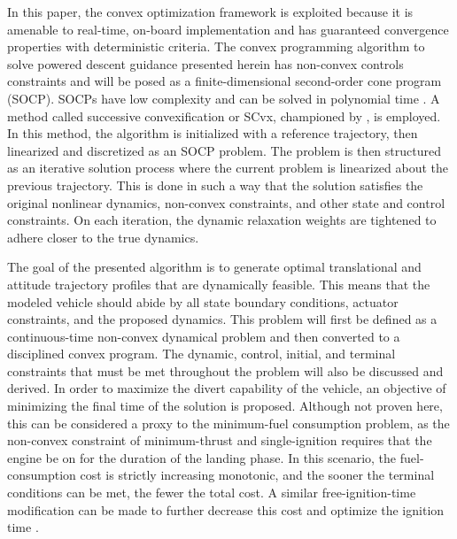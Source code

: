 \documentclass[conf]{new-aiaa}
\begin{document}
In this paper, the convex optimization framework is exploited because it is amenable to real-time, on-board implementation and has guaranteed convergence properties with deterministic criteria. The convex programming algorithm to solve powered descent guidance presented herein has non-convex controls constraints and will be posed as a finite-dimensional second-order cone program (SOCP). SOCPs have low complexity and can be solved in polynomial time \cite{nesterov1994interior} \cite{boyd2004convex}.
A method called successive convexification or SCvx, championed by \cite{mao2016successive}, is employed. In this method, the algorithm is initialized with a reference trajectory, then linearized and discretized as an SOCP problem. The problem is then structured as an iterative solution process where the current problem is linearized about the previous trajectory. This is done in such a way that the solution satisfies the original nonlinear dynamics, non-convex constraints, and other state and control constraints. On each iteration, the dynamic relaxation weights are tightened to adhere closer to the true dynamics.

The goal of the presented algorithm is to generate optimal translational and attitude trajectory profiles that are dynamically feasible. This means that the modeled vehicle should abide by all state boundary conditions, actuator constraints, and the proposed dynamics. This problem will first be defined as a continuous-time non-convex dynamical problem and then converted to a disciplined convex program. The dynamic, control, initial, and terminal constraints that must be met throughout the problem will also be discussed and derived. In order to maximize the divert capability of the vehicle, an objective of minimizing the final time of the solution is proposed. Although not proven here, this can be considered a proxy to the minimum-fuel consumption problem, as the non-convex constraint of minimum-thrust and single-ignition requires that the engine be on for the duration of the landing phase. In this scenario, the fuel-consumption cost is strictly increasing monotonic, and the sooner the terminal conditions can be met, the fewer the total cost. A similar free-ignition-time modification can be made to further decrease this cost and  optimize the ignition time \cite{szmuk2019successive}. 
\end{document}
